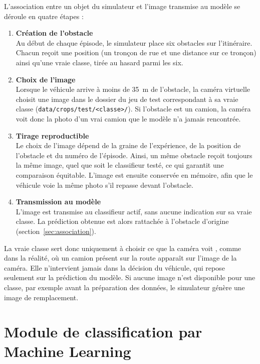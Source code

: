 L'association entre un objet du simulateur et l'image transmise au modèle se déroule en quatre étapes :

\begin{enumerate}
  \item \textbf{Création de l'obstacle}\\
  Au début de chaque épisode, le simulateur place six obstacles sur l'itinéraire. Chacun reçoit une position (un tronçon de rue et une distance sur ce tronçon) ainsi qu'une vraie classe, tirée au hasard parmi les six.
  \item \textbf{Choix de l'image}\\
  Lorsque le véhicule arrive à moins de 35~m de l'obstacle, la caméra virtuelle choisit une image dans le dossier du jeu de test correspondant à sa vraie classe (\texttt{data/crops/test/<classe>/}). Si l'obstacle est un camion, la caméra \og voit \fg{} donc la photo d'un vrai camion que le modèle n'a jamais rencontrée.
  \item \textbf{Tirage reproductible}\\
  Le choix de l'image dépend de la graine de l'expérience, de la position de l'obstacle et du numéro de l'épisode. Ainsi, un même obstacle reçoit toujours la même image, quel que soit le classifieur testé, ce qui garantit une comparaison équitable. L'image est ensuite conservée en mémoire, afin que le véhicule voie la même photo s'il repasse devant l'obstacle.
  \item \textbf{Transmission au modèle}\\
  L'image est transmise au classifieur actif, sans aucune indication sur sa vraie classe. La prédiction obtenue est alors rattachée à l'obstacle d'origine (section~\ref{sec:association}).
\end{enumerate}

La vraie classe sert donc uniquement à choisir ce que la caméra \og voit \fg{}, comme dans la réalité, où un camion présent sur la route apparaît sur l'image de la caméra. Elle n'intervient jamais dans la décision du véhicule, qui repose seulement sur la prédiction du modèle. Si aucune image n'est disponible pour une classe, par exemple avant la préparation des données, le simulateur génère une image de remplacement.

\section{Module de classification par Machine Learning}
\label{sec:module-classification}

